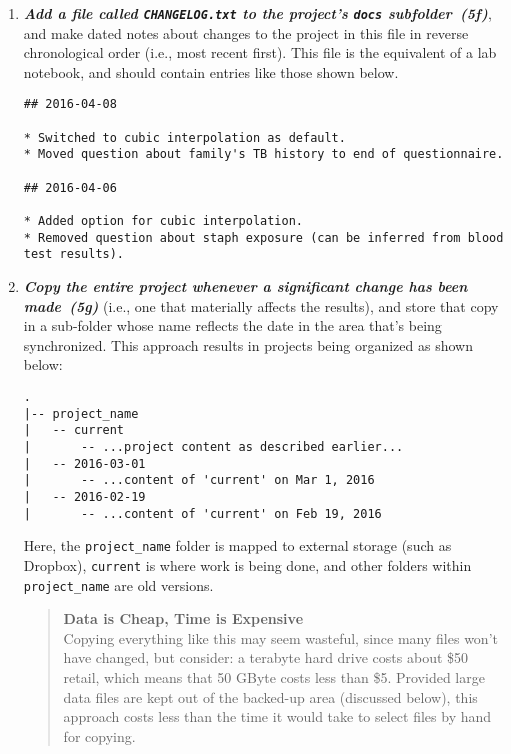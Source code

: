 \documentclass[10pt,letterpaper]{article}
\newcommand{\practice}[2]{\textbf{\emph{{#2}~({#1})}}}
\begin{document}
\begin{enumerate}

\item

  \practice{5f}{Add a file called \texttt{CHANGELOG.txt} to the
  project's \texttt{docs} subfolder}, and make dated notes about
  changes to the project in this file in reverse chronological order
  (i.e., most recent first). This file is the equivalent of a lab
  notebook, and should contain entries like those shown below.

{\small
\begin{verbatim}
## 2016-04-08

* Switched to cubic interpolation as default.
* Moved question about family's TB history to end of questionnaire.

## 2016-04-06

* Added option for cubic interpolation.
* Removed question about staph exposure (can be inferred from blood test results).
\end{verbatim}
}

\item

  \practice{5g}{Copy the entire project whenever a significant change
  has been made} (i.e., one that materially affects the results),
  and store that copy in a sub-folder whose name reflects the date in
  the area that's being synchronized. This approach results in
  projects being organized as shown below:

{\small
\begin{verbatim}
.
|-- project_name
|   -- current
|       -- ...project content as described earlier...
|   -- 2016-03-01
|       -- ...content of 'current' on Mar 1, 2016
|   -- 2016-02-19
|       -- ...content of 'current' on Feb 19, 2016
\end{verbatim}
}

  Here, the \texttt{project\_name} folder is mapped to external
  storage (such as Dropbox), \texttt{current} is where work is
  being done, and other folders within \texttt{project\_name}
  are old versions.

  \begin{quote}
    \noindent \textbf{Data is Cheap, Time is Expensive}
    \\
    Copying everything like this may seem wasteful, since many files
    won't have changed, but consider: a terabyte hard drive costs
    about \$50 retail, which means that 50 GByte costs less than
    \$5. Provided large data files are kept out of the backed-up area
    (discussed below), this approach costs less than the time it would
    take to select files by hand for copying.
  \end{quote}

\end{enumerate}
\end{document}
